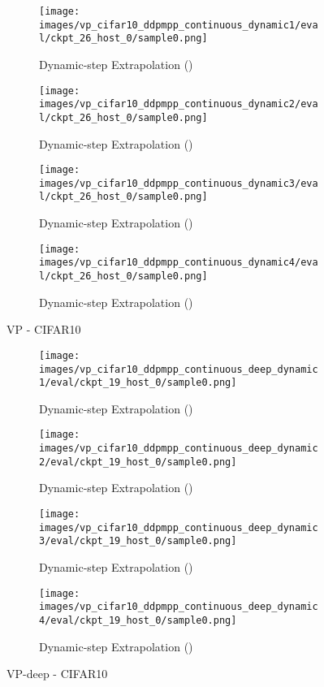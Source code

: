 \documentclass{article}
\begin{document}
\begin{figure}[ht] 
  \begin{subfigure}[b]{0.5\linewidth}
    \centering
    \texttt{[image: images/vp\_cifar10\_ddpmpp\_continuous\_dynamic1/eval/ckpt\_26\_host\_0/sample0.png]} 
    \caption{Dynamic-step Extrapolation ()} 
  \end{subfigure}
  \begin{subfigure}[b]{0.5\linewidth}
    \centering
    \texttt{[image: images/vp\_cifar10\_ddpmpp\_continuous\_dynamic2/eval/ckpt\_26\_host\_0/sample0.png]}
    \caption{Dynamic-step Extrapolation ()} 
  \end{subfigure}
  \begin{subfigure}[b]{0.5\linewidth}
    \centering
    \texttt{[image: images/vp\_cifar10\_ddpmpp\_continuous\_dynamic3/eval/ckpt\_26\_host\_0/sample0.png]} 
    \caption{Dynamic-step Extrapolation ()} 
  \end{subfigure}
  \begin{subfigure}[b]{0.5\linewidth}
    \centering
    \texttt{[image: images/vp\_cifar10\_ddpmpp\_continuous\_dynamic4/eval/ckpt\_26\_host\_0/sample0.png]}
    \caption{Dynamic-step Extrapolation ()} 
  \end{subfigure}
  \caption{VP - CIFAR10}
  \label{fig11} 
\end{figure}


\begin{figure}[ht] 
  \begin{subfigure}[b]{0.5\linewidth}
    \centering
    \texttt{[image: images/vp\_cifar10\_ddpmpp\_continuous\_deep\_dynamic1/eval/ckpt\_19\_host\_0/sample0.png]} 
    \caption{Dynamic-step Extrapolation ()} 
  \end{subfigure}
  \begin{subfigure}[b]{0.5\linewidth}
    \centering
    \texttt{[image: images/vp\_cifar10\_ddpmpp\_continuous\_deep\_dynamic2/eval/ckpt\_19\_host\_0/sample0.png]}
    \caption{Dynamic-step Extrapolation ()} 
  \end{subfigure}
  \begin{subfigure}[b]{0.5\linewidth}
    \centering
    \texttt{[image: images/vp\_cifar10\_ddpmpp\_continuous\_deep\_dynamic3/eval/ckpt\_19\_host\_0/sample0.png]} 
    \caption{Dynamic-step Extrapolation ()} 
  \end{subfigure}
  \begin{subfigure}[b]{0.5\linewidth}
    \centering
    \texttt{[image: images/vp\_cifar10\_ddpmpp\_continuous\_deep\_dynamic4/eval/ckpt\_19\_host\_0/sample0.png]}
    \caption{Dynamic-step Extrapolation ()} 
  \end{subfigure}
  \caption{VP-deep - CIFAR10}
  \label{fig12} 
\end{figure}
\end{document}

